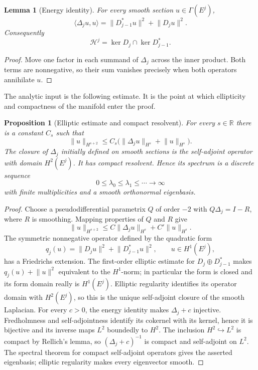 \documentclass[11pt,oneside,reqno]{book}
\theoremstyle{plain}
\newtheorem{proposition}[theorem]{Proposition}
\newtheorem{lemma}[theorem]{Lemma}
\theoremstyle{definition}
\theoremstyle{remark}
\begin{document}
\begin{lemma}[Energy identity]
For every smooth section \(u\in\Gamma(E^j)\),
\[
 \langle\Delta_ju,u\rangle
 =\lVert D_{j-1}^*u\rVert^2+\lVert D_ju\rVert^2.
\]
Consequently
\[
 \mathcal H^j=\ker D_j\cap\ker D_{j-1}^*.
\]
\end{lemma}

\begin{proof}
Move one factor in each summand of \(\Delta_j\) across the inner
product.  Both terms are nonnegative, so their sum vanishes precisely
when both operators annihilate \(u\).
\end{proof}

The analytic input is the following estimate.  It is the point at which
ellipticity and compactness of the manifold enter the proof.

\begin{proposition}[Elliptic estimate and compact resolvent]
For every \(s\in\mathbb R\) there is a constant \(C_s\) such that
\[
 \lVert u\rVert_{H^{s+2}}
 \leq C_s\bigl(\lVert\Delta_ju\rVert_{H^s}
                    +\lVert u\rVert_{H^s}\bigr).
\]
The closure of \(\Delta_j\) initially defined on smooth sections is the
self-adjoint operator with domain \(H^2(E^j)\).  It has compact resolvent.
Hence its spectrum is a discrete sequence
\[
 0\leq\lambda_0\leq\lambda_1\leq\cdots\longrightarrow\infty
\]
with finite multiplicities and a smooth orthonormal eigenbasis.
\end{proposition}

\begin{proof}
Choose a pseudodifferential parametrix \(Q\) of order \(-2\) with
\(Q\Delta_j=I-R\), where \(R\) is smoothing.  Mapping properties of
\(Q\) and \(R\) give
\[
 \lVert u\rVert_{H^{s+2}}
 \leq C\lVert\Delta_ju\rVert_{H^s}+C'\lVert u\rVert_{H^s}.
\]
The symmetric nonnegative operator defined by the quadratic form
\[
 q_j(u)=\lVert D_ju\rVert^2+\lVert D_{j-1}^*u\rVert^2,
 \qquad u\in H^1(E^j),
\]
has a Friedrichs extension.  The first-order elliptic estimate for
\(D_j\oplus D_{j-1}^*\) makes
\(q_j(u)+\lVert u\rVert^2\) equivalent to the \(H^1\)-norm; in particular
the form is closed and its form domain really is \(H^1(E^j)\).
Elliptic regularity identifies its operator
domain with \(H^2(E^j)\), so this is the unique self-adjoint closure of the
smooth Laplacian.  For every \(c>0\), the energy identity makes
\(\Delta_j+c\) injective.  Fredholmness and self-adjointness identify its
cokernel with its kernel, hence it is bijective and its inverse maps
\(L^2\) boundedly to \(H^2\).
The inclusion \(H^2\hookrightarrow L^2\) is compact by Rellich's lemma,
so \((\Delta_j+c)^{-1}\) is compact and self-adjoint on \(L^2\).  The
spectral theorem for compact self-adjoint operators gives the asserted
eigenbasis; elliptic regularity makes every eigenvector smooth.
\end{proof}
\end{document}
